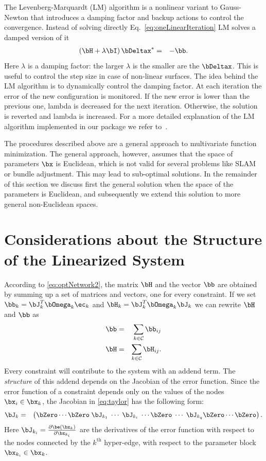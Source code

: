 \documentclass[a4paper]{article}
\begin{document}
The Levenberg-Marquardt (LM) algorithm is a nonlinear variant to Gauss-Newton that introduces
a damping factor and backup actions to control the convergence.
Instead of solving directly Eq.~\ref{eq:oneLinearIteration}
LM solves a damped version of it
\begin{eqnarray}
       (\bH +\lambda \bI)\,\bDeltax^* &=& - \bb.
\label{eq:oneLinearIterationLevenberg}
\end{eqnarray}
Here $\lambda$ is a damping factor: the larger $\lambda$ is the
smaller are the $\bDeltax$. This is useful to control the step size in
case of non-linear surfaces.  The idea behind the LM algorithm is to
dynamically control the damping factor.  At each iteration the error
of the new configuration is monitored.  If the new error is lower than
the previous one, lambda is decreased for the next iteration.
Otherwise, the solution is reverted and lambda is increased.
For a more detailed explanation of the LM algorithm implemented in our package
we refer to~\cite{lourakis2009toms}.

The procedures described above are a general approach to multivariate
function minimization. The general approach, however, assumes that the
space of parameters $\bx$ is Euclidean, which is not valid for several
problems like SLAM or bundle adjustment. This may lead to sub-optimal
solutions. In the remainder of this section we discuss first the
general solution when the space of the parameters is Euclidean, and
subsequently we extend this solution to more general non-Euclidean
spaces.

\section{Considerations about the Structure of the Linearized System}
According to \eqref{eq:optNetwork2}, the matrix $\bH$ and the vector
$\bb$ are obtained by summing up a set of matrices and vectors, one
for every constraint.  If we set $\bb_{k}=\bJ_{k}^T \bOmega_{k}
\ec_{k}$ and $\bH_{k}= \bJ_{k}^T \bOmega_{k}\bJ_{k}$ we can
rewrite $\bH$ and $\bb$ as
\begin{eqnarray}
  \bb&=&\sum_{k \in\mathcal{C}} \bb_{ij}\\
  \bH&=&\sum_{k \in\mathcal{C}} \bH_{ij}. \label{eq:addendTerm}
\end{eqnarray}
Every constraint will contribute to the system with an addend
term. The \emph{structure} of this addend depends on the Jacobian of
the error function.  Since the error function of a constraint depends
only on the values of the nodes $\bx_i \in \bx_k$, the Jacobian in
\eqref{eq:taylor} has the following form:
\begin{eqnarray}
\bJ_{k} &=& \left(\bZero \cdots \bZero \; \bJ_{k_1} \; \cdots \; \bJ_{k_i} \;\cdots \bZero\; \cdots\;  \bJ_{k_q} \bZero \cdots \bZero \right).
\label{eq:jacExpanded}
\end{eqnarray}
Here $\bJ_{k_i}= \frac{\partial \be(\bx_k)}{\partial \bx_{k_i}}$ are the
derivatives of the error function with respect to the nodes connected
by the $k^\mathrm{th}$ hyper-edge, with respect to the parameter block
$\bx_{k_i} \in \bx_k$.
\end{document}
